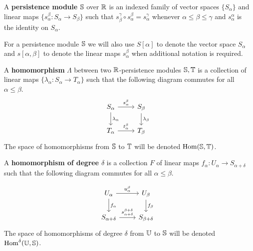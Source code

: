 
\begin{definition}
  A \textbf{persistence module} $\S$ over $\R$ is an indexed family of vector spaces $\{S_\alpha\}$ and linear maps $\{s_\alpha^\beta : S_\alpha\to S_\beta\}$ such that $s^\gamma_\beta\circ s_\alpha^\beta = s_\alpha^\gamma$ whenever $\alpha\leq\beta\leq\gamma$ and $s_\alpha^\alpha$ is the identity on $S_\alpha$.
\end{definition}

For a persistence module $\S$ we will also use $S[\alpha]$ to denote the vector space $S_\alpha$ and $s[\alpha,\beta]$ to denote the linear maps $s_\alpha^\beta$ when additional notation is required.

\begin{definition}
  A \textbf{homomorphism} $\Lambda$ between two $\R$-persistence modules $\S, \T$ is a collection of linear maps $\{\lambda_\alpha : S_\alpha\to T_\alpha\}$ such that the following diagram commutes for all $\alpha\leq\beta$.
  \begin{equation}\label{dgm:homomorphism}
    \begin{tikzcd}
      S_\alpha\arrow{r}{s_\alpha^\beta}\arrow{d}{\lambda_\alpha} &
      S_\beta\arrow{d}{\lambda_\beta}\\
      T_\alpha\arrow{r}{t_\alpha^\beta} &
      T_\beta
  \end{tikzcd}\end{equation}
  The space of homomorphisms from $\S$ to $\T$ will be denoted $\Hom(\S, \T)$.
\end{definition}

\begin{definition}
  A \textbf{homomorphism of degree $\delta$} is a collection $F$ of linear maps $f_\alpha : U_\alpha\to S_{\alpha+\delta}$ such that the following diagram commutes for all $\alpha\leq\beta$.

  \begin{equation}\label{dgm:shifted_homomorphism}
    \begin{tikzcd}
      U_\alpha\arrow{r}{u_\alpha^\beta}\arrow{d}{f_\alpha} &
      U_\beta\arrow{d}{f_\beta}\\
      S_{\alpha+\delta}\arrow{r}{s_{\alpha+\delta}^{\beta+\delta}} &
      S_{\beta +\delta}
  \end{tikzcd}\end{equation}
  The space of homomorphisms of degree $\delta$ from $\U$ to $\S$ will be denoted $\Hom^\delta(\U, \S)$.
\end{definition}

